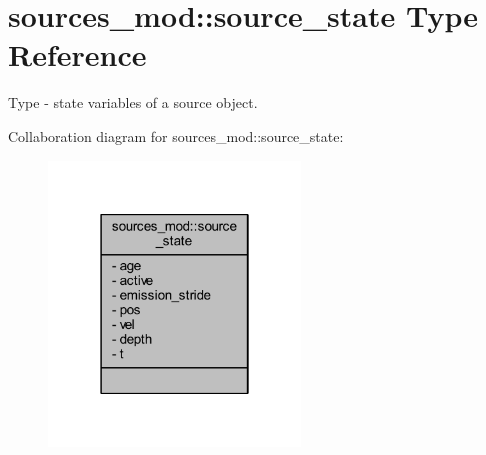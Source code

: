 \hypertarget{structsources__mod_1_1source__state}{}\section{sources\+\_\+mod\+:\+:source\+\_\+state Type Reference}
\label{structsources__mod_1_1source__state}


Type -\/ state variables of a source object.  




Collaboration diagram for sources\+\_\+mod\+:\+:source\+\_\+state\+:
\nopagebreak
\begin{figure}[H]
\begin{center}
\leavevmode
\includegraphics[width=190pt]{structsources__mod_1_1source__state__coll__graph}
\end{center}
\end{figure}
